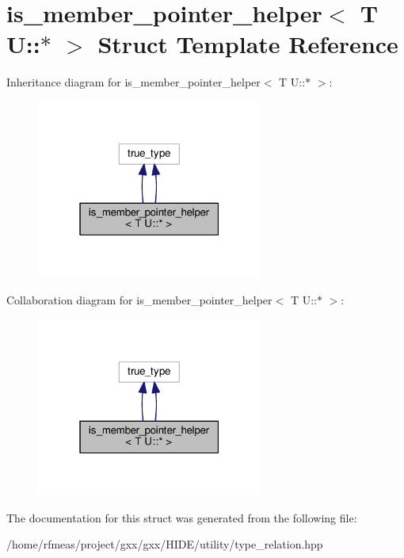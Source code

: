 \hypertarget{structis__member__pointer__helper_3_01T_01U_1_1_5_01_4}{}\section{is\+\_\+member\+\_\+pointer\+\_\+helper$<$ T U\+:\+:$\ast$ $>$ Struct Template Reference}
\label{structis__member__pointer__helper_3_01T_01U_1_1_5_01_4}


Inheritance diagram for is\+\_\+member\+\_\+pointer\+\_\+helper$<$ T U\+:\+:$\ast$ $>$\+:
\nopagebreak
\begin{figure}[H]
\begin{center}
\leavevmode
\includegraphics[width=211pt]{structis__member__pointer__helper_3_01T_01U_1_1_5_01_4__inherit__graph}
\end{center}
\end{figure}


Collaboration diagram for is\+\_\+member\+\_\+pointer\+\_\+helper$<$ T U\+:\+:$\ast$ $>$\+:
\nopagebreak
\begin{figure}[H]
\begin{center}
\leavevmode
\includegraphics[width=211pt]{structis__member__pointer__helper_3_01T_01U_1_1_5_01_4__coll__graph}
\end{center}
\end{figure}


The documentation for this struct was generated from the following file\+:\begin{DoxyCompactItemize}
\item 
/home/rfmeas/project/gxx/gxx/\+H\+I\+D\+E/utility/type\+\_\+relation.\+hpp\end{DoxyCompactItemize}
